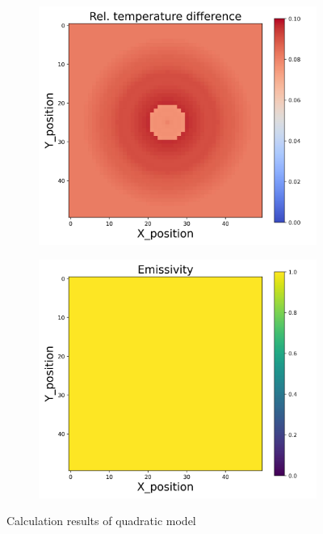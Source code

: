 \begin{figure}[htbp]
\begin{minipage}{\textwidth}
\begin{subfigure}{0.325\textwidth}
        \end{subfigure}
        \begin{subfigure}{0.325\textwidth}
            \centering
            \includegraphics[width=\textwidth]{figures/raw_data/5/quad/T_bias.jpg}
        \end{subfigure}
        \begin{subfigure}{0.325\textwidth}
            \centering
            \includegraphics[width=\textwidth]{figures/raw_data/5/quad/emi_cal.jpg}
        \end{subfigure}
    \end{minipage}
    \caption{Calculation results of quadratic model}
    \label{fig: result_quadratic_model}
\end{figure}


